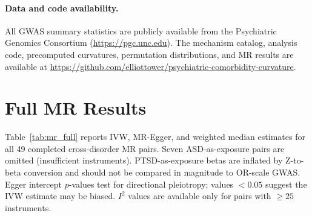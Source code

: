 \documentclass{article}
\begin{document}
\paragraph{Data and code availability.} All GWAS summary statistics are publicly available from the Psychiatric Genomics Consortium (\url{https://pgc.unc.edu}). The mechanism catalog, analysis code, precomputed curvatures, permutation distributions, and MR results are available at \url{https://github.com/elliottower/psychiatric-comorbidity-curvature}.




\appendix

\section{Full MR Results}
\label{app:mr}

Table~\ref{tab:mr_full} reports IVW, MR-Egger, and weighted median estimates for all 49 completed cross-disorder MR pairs. Seven ASD-as-exposure pairs are omitted (insufficient instruments). PTSD-as-exposure betas are inflated by Z-to-beta conversion and should not be compared in magnitude to OR-scale GWAS. Egger intercept $p$-values test for directional pleiotropy; values $< 0.05$ suggest the IVW estimate may be biased. $I^2$ values are available only for pairs with $\geq 25$ instruments.
\end{document}
